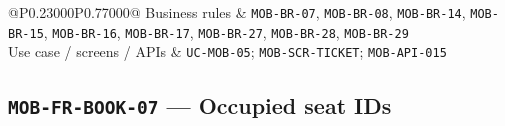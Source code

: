 \begin{longtable}{@{}P{0.23000\SRSWidth}P{0.77000\SRSWidth}@{}}
Business rules & \texttt{MOB-\allowbreak{}BR-\allowbreak{}07}, \texttt{MOB-\allowbreak{}BR-\allowbreak{}08}, \texttt{MOB-\allowbreak{}BR-\allowbreak{}14}, \texttt{MOB-\allowbreak{}BR-\allowbreak{}15}, \texttt{MOB-\allowbreak{}BR-\allowbreak{}16}, \texttt{MOB-\allowbreak{}BR-\allowbreak{}17}, \texttt{MOB-\allowbreak{}BR-\allowbreak{}27}, \texttt{MOB-\allowbreak{}BR-\allowbreak{}28}, \texttt{MOB-\allowbreak{}BR-\allowbreak{}29} \\[3pt]
Use case /\allowbreak{} screens /\allowbreak{} APIs & \texttt{UC-\allowbreak{}MOB-\allowbreak{}05}; \texttt{MOB-\allowbreak{}SCR-\allowbreak{}TICKET}; \texttt{MOB-\allowbreak{}API-\allowbreak{}015} \\[3pt]
\end{longtable}
\endgroup

\subsection{\texttt{MOB-\allowbreak{}FR-\allowbreak{}BOOK-\allowbreak{}07} — Occupied seat IDs}
\begingroup
\fontsize{9.5}{12}\selectfont
\setlength{\SRSWidth}{\dimexpr\linewidth-2\tabcolsep\relax}
